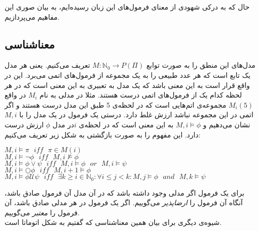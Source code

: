 حال که به درکی شهودی از معنای فرمول‌های این زبان رسیده‌ایم، به بیان صوری این مفاهیم می‌پردازیم.

\subsection{معناشناسی }

مدل‌های این منطق را به صورت توابع
$M:\mathbb{N}_0 \rightarrow \mathit{P}(\Pi)$ 
تعریف می‌کنیم. یعنی هر مدل یک تابع است که هر عدد طبیعی را به یک مجموعه از فرمول‌های اتمی می‌برد. این در واقع قرار است به این معنی باشد که یک مدل به تعبیری به این معنی است که در هر لحظه کدام یک از فرمول‌های اتمی درست هستند. مثلا در مدلی به نام $M_i$ در واقع
$M_i(5)$
مجموعه‌ی اتم‌هایی است که در لحظه‌ی 5 طبق این مدل درست هستند و اگر اتمی در این مجموعه نباشد ارزش غلط دارد.
درستی یک فرمول در یک مدل را با 
$M,i$
نشان می‌دهیم و 
$M,i \models \phi$
به این معنی است که در لحظه‌ی $i$در مدل $\phi$ ارزش درست دارد. این مفهوم را به صورت بازگشتی به شکل زیر تعریف می‌کنیم:


\begin{flushleft}
$	M,i \models \pi \:\:\: \mathit{iff} \:\:\: \pi \in M(i)$\\
$	M,i \models \neg \phi \:\:\: \mathit{iff} \:\:\: M,i\nvDash \phi$\\
$	M,i \models \phi \lor \psi \:\:\: \mathit{iff} \:\:\: M,i \models \phi \:\:\: \mathit{or} \:\:\: M,i \models \psi$\\
	 $M,i \models \bigcirc \phi  \:\:\:  \mathit{iff} \:\:\: M,i+1 \models \phi$\\
	 $M,i \models \phi \mathcal{U} \psi \:\:\: \mathit{iff} \:\:\: 
	 \exists k \geq i \in \mathbb{N}_0: \forall i\leq j< k: M,j \models \phi \:\:\: \mathit{and} \:\:\: M,k \models \psi$
\end{flushleft}

برای یک فرمول اگر مدلی وجود داشته باشد که در آن مدل آن فرمول صادق باشد، آنگاه آن فرمول را \emph{ارضاپذیر} می‌گوییم. اگر یک فرمول در هر مدلی صادق باشد، آن فرمول را \emph{معتبر} می‌گوییم.\\
شیوه‌ی دیگری برای بیان همین معناشناسی که گفتیم به شکل اتوماتا است. 